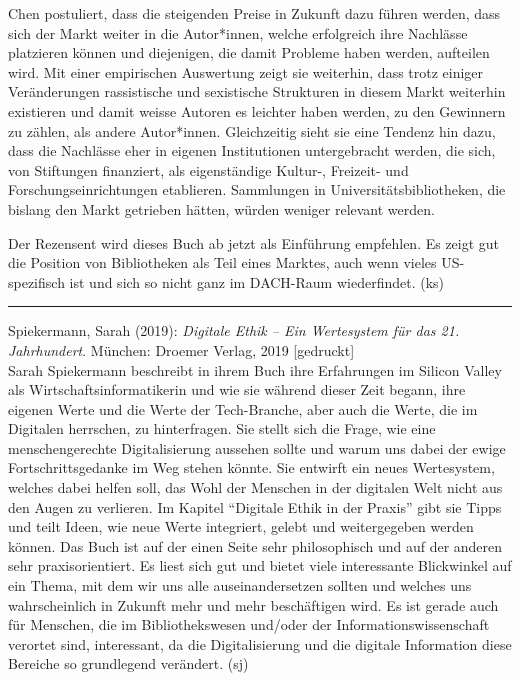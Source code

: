 \documentclass[a4paper,
fontsize=11pt,
oneside,
numbers=noperiodatend,
parskip=half-,
bibliography=totoc,
final
]{scrartcl}
\begin{document}
Chen postuliert, dass die steigenden Preise in Zukunft dazu führen
werden, dass sich der Markt weiter in die Autor*innen, welche
erfolgreich ihre Nachlässe platzieren können und diejenigen, die damit
Probleme haben werden, aufteilen wird. Mit einer empirischen Auswertung
zeigt sie weiterhin, dass trotz einiger Veränderungen rassistische und
sexistische Strukturen in diesem Markt weiterhin existieren und damit
weisse Autoren es leichter haben werden, zu den Gewinnern zu zählen, als
andere Autor*innen. Gleichzeitig sieht sie eine Tendenz hin dazu, dass
die Nachlässe eher in eigenen Institutionen untergebracht werden, die
sich, von Stiftungen finanziert, als eigenständige Kultur-, Freizeit-
und Forschungseinrichtungen etablieren. Sammlungen in
Universitätsbibliotheken, die bislang den Markt getrieben hätten, würden
weniger relevant werden.

Der Rezensent wird dieses Buch ab jetzt als Einführung empfehlen. Es
zeigt gut die Position von Bibliotheken als Teil eines Marktes, auch
wenn vieles US-spezifisch ist und sich so nicht ganz im DACH-Raum
wiederfindet. (ks)

\begin{center}\rule{0.5\linewidth}{0.5pt}\end{center}

\pagebreak

Spiekermann, Sarah (2019): \emph{Digitale Ethik -- Ein Wertesystem für
das 21. Jahrhundert}. München: Droemer Verlag, 2019 {[}gedruckt{]}\\
Sarah Spiekermann beschreibt in ihrem Buch ihre Erfahrungen im Silicon
Valley als Wirtschaftsinformatikerin und wie sie während dieser Zeit
begann, ihre eigenen Werte und die Werte der Tech-Branche, aber auch die
Werte, die im Digitalen herrschen, zu hinterfragen. Sie stellt sich die
Frage, wie eine menschengerechte Digitalisierung aussehen sollte und
warum uns dabei der ewige Fortschrittsgedanke im Weg stehen könnte. Sie
entwirft ein neues Wertesystem, welches dabei helfen soll, das Wohl der
Menschen in der digitalen Welt nicht aus den Augen zu verlieren. Im
Kapitel \enquote{Digitale Ethik in der Praxis} gibt sie Tipps und teilt Ideen,
wie neue Werte integriert, gelebt und weitergegeben werden können. Das
Buch ist auf der einen Seite sehr philosophisch und auf der anderen sehr
praxisorientiert. Es liest sich gut und bietet viele interessante
Blickwinkel auf ein Thema, mit dem wir uns alle auseinandersetzen
sollten und welches uns wahrscheinlich in Zukunft mehr und mehr
beschäftigen wird. Es ist gerade auch für Menschen, die im
Bibliothekswesen und/oder der Informationswissenschaft verortet sind,
interessant, da die Digitalisierung und die digitale Information diese
Bereiche so grundlegend verändert. (sj)
\end{document}
